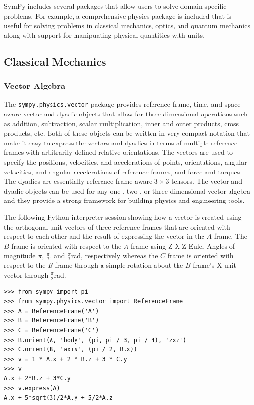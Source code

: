 SymPy includes several packages that allow users to solve domain specific
problems. For example, a comprehensive physics package is included that is
useful for solving problems in classical mechanics, optics, and quantum
mechanics along with support for manipuating physical quantities with units.


\subsection{Classical Mechanics}

\subsubsection{Vector Algebra}

The \verb|sympy.physics.vector| package provides reference frame, time, and
space aware vector and dyadic objects that allow for three dimensional
operations such as addition, subtraction, scalar multiplication, inner and
outer products, cross products, etc. Both of these objects can be written in
very compact notation that make it easy to express the vectors and dyadics in
terms of multiple reference frames with arbitrarily defined relative
orientations. The vectors are used to specify the positions, velocities, and
accelerations of points, orientations, angular velocities, and angular
accelerations of reference frames, and force and torques. The dyadics are
essentially reference frame aware $3 \times 3$ tensors. The vector and dyadic
objects can be used for any one-, two-, or three-dimensional vector algebra and
they provide a strong framework for building physics and engineering tools.

The following Python interpreter session showing how a vector is created using
the orthogonal unit vectors of three reference frames that are oriented with
respect to each other and the result of expressing the vector in the $A$
frame. The $B$ frame is oriented with respect to the $A$ frame using Z-X-Z
Euler Angles of magnitude $\pi$, $\frac{\pi}{2}$, and
$\frac{\pi}{3}$\si{\radian}, respectively whereas the $C$ frame is oriented
with respect to the $B$ frame through a simple rotation about the $B$ frame's
X unit vector through $\frac{\pi}{2}$\si{\radian}.

\begin{verbatim}
>>> from sympy import pi
>>> from sympy.physics.vector import ReferenceFrame
>>> A = ReferenceFrame('A')
>>> B = ReferenceFrame('B')
>>> C = ReferenceFrame('C')
>>> B.orient(A, 'body', (pi, pi / 3, pi / 4), 'zxz')
>>> C.orient(B, 'axis', (pi / 2, B.x))
>>> v = 1 * A.x + 2 * B.z + 3 * C.y
>>> v
A.x + 2*B.z + 3*C.y
>>> v.express(A)
A.x + 5*sqrt(3)/2*A.y + 5/2*A.z
\end{verbatim}

